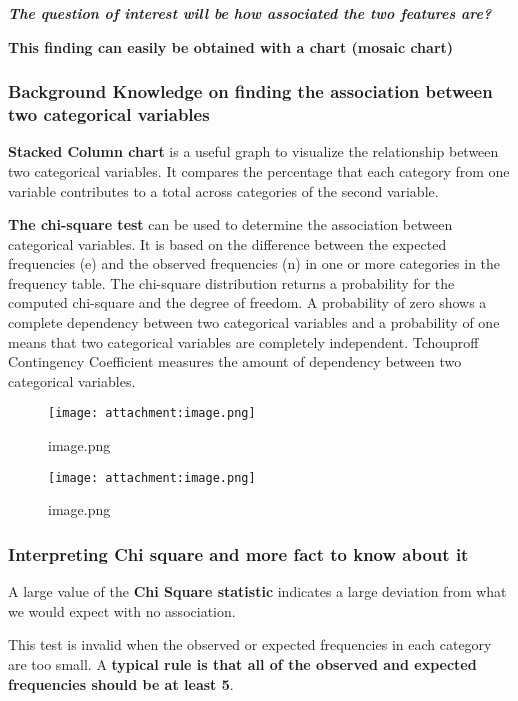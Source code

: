 \documentclass[11pt]{article}
\makeatletter
\def\maxwidth{\ifdim\Gin@nat@width>\linewidth\linewidth
    \else\Gin@nat@width\fi}
\let\Oldincludegraphics\includegraphics
\renewcommand{\includegraphics}[1]{\Oldincludegraphics[width=.8\maxwidth]{#1}}
\makeatother
\begin{document}
\textbf{\emph{The question of interest will be how associated the two
features are?}}

\textbf{This finding can easily be obtained with a chart (mosaic chart)}

    \subsubsection{Background Knowledge on finding the association between
two categorical
variables}\label{background-knowledge-on-finding-the-association-between-two-categorical-variables}

\textbf{Stacked Column chart} is a useful graph to visualize the
relationship between two categorical variables. It compares the
percentage that each category from one variable contributes to a total
across categories of the second variable.

\textbf{The chi-square test} can be used to determine the association
between categorical variables. It is based on the difference between the
expected frequencies (e) and the observed frequencies (n) in one or more
categories in the frequency table. The chi-square distribution returns a
probability for the computed chi-square and the degree of freedom. A
probability of zero shows a complete dependency between two categorical
variables and a probability of one means that two categorical variables
are completely independent. Tchouproff Contingency Coefficient measures
the amount of dependency between two categorical variables.

\begin{figure}
\centering
\texttt{[image: attachment:image.png]}
\caption{image.png}
\end{figure}

    \begin{figure}
\centering
\texttt{[image: attachment:image.png]}
\caption{image.png}
\end{figure}

    \subsubsection{Interpreting Chi square and more fact to know about
it}\label{interpreting-chi-square-and-more-fact-to-know-about-it}

A large value of the \textbf{Chi Square statistic} indicates a large
deviation from what we would expect with no association.

This test is invalid when the observed or expected frequencies in each
category are too small. A \textbf{typical rule is that all of the
observed and expected frequencies should be at least 5}.
\end{document}
